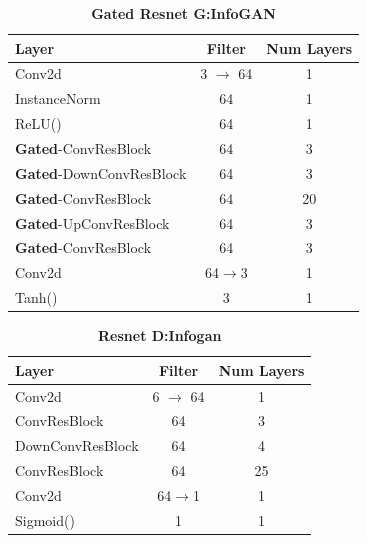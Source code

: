\documentclass[10pt,twocolumn,letterpaper]{article}
\begin{document}
\begin{table}[ht]
\caption{\textbf{Gated Resnet G:InfoGAN}}
\centering %
\begin{tabular}{l c c} %
\toprule%
\textbf{Layer} & \textbf{Filter} & \textbf{Num Layers} \\
\midrule
Conv2d & 3 $\rightarrow$ 64 & 1\\
InstanceNorm & 64 & 1 \\ %
ReLU() & 64 & 1\\
\hdashline%
\textbf{Gated}-ConvResBlock & 64 & 3\\
\textbf{Gated}-DownConvResBlock & 64 & 3\\
\textbf{Gated}-ConvResBlock & 64 & 20\\
\textbf{Gated}-UpConvResBlock & 64 & 3\\
\textbf{Gated}-ConvResBlock & 64 & 3\\
\hdashline
Conv2d & 64$\rightarrow$3 & 1 \\
Tanh() & 3 & 1 \\
\bottomrule%
\end{tabular}
\label{table:resnet_g_infogan} %
\end{table}


\begin{table}[ht]
\caption{\textbf{Resnet D:Infogan}}
\centering %
\begin{tabular}{l c c} %
\toprule%
\textbf{Layer} & \textbf{Filter} & \textbf{Num Layers} \\
\midrule
Conv2d & 6 $\rightarrow$ 64 & 1\\
\hdashline%
ConvResBlock & 64 & 3\\
DownConvResBlock & 64 & 4\\
ConvResBlock & 64 & 25\\
\hdashline
Conv2d & 64$\rightarrow$1 & 1 \\
Sigmoid() & 1 & 1 \\
\bottomrule%
\end{tabular}
\label{table:resnet_d_infogan} %
\end{table}
\end{document}
